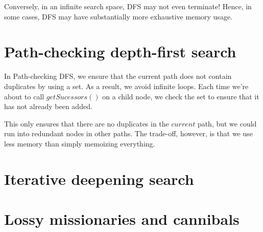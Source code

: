 \documentclass[a4paper]{report}
\begin{document}
Conversely, in an infinite search space, DFS may not even terminate! Hence, in some cases, DFS may have substantially more exhaustive
memory usage. 


\section{Path-checking depth-first search}

In Path-checking DFS, we ensure that the current path does not contain duplicates by using a set. As a result,
we avoid infinite loops. Each time we're about to call $getSucessors()$ on a child node, we check the set
to ensure that it has not already been added. 

This only ensures that there are no duplicates in the $current$ path, but we could run into redundant 
nodes in other paths. The trade-off, however, is that we use less memory than simply memoizing everything. 


\section{Iterative deepening search}



\section{Lossy missionaries and cannibals}
\end{document}
